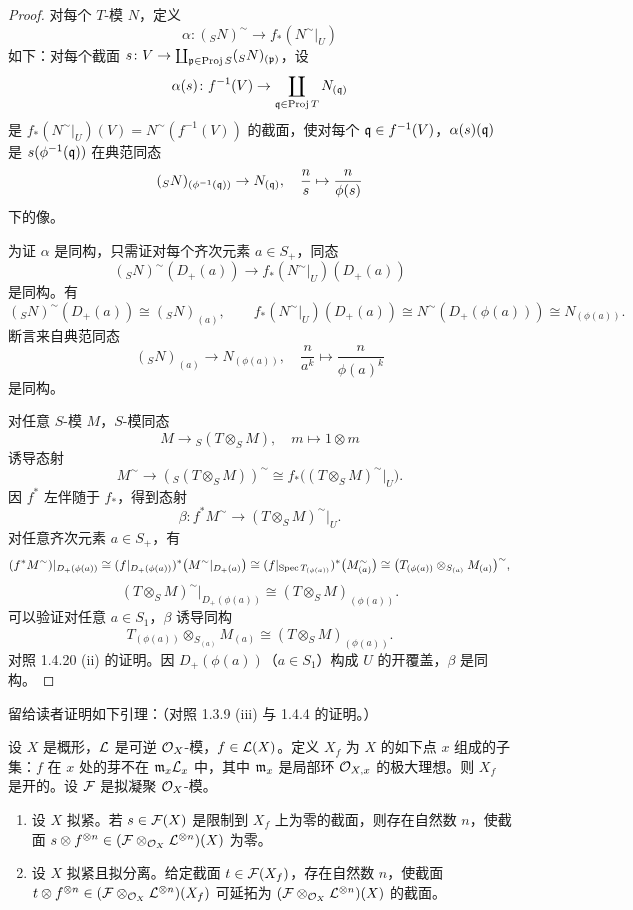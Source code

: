 \begin{proof}
对每个 $T$-模 $N$，定义
\[
\alpha\colon({}_SN)^\sim\to f_*(N^\sim|_U)
\]
如下：对每个截面 $s\colon V\to\coprod_{\mathfrak{p}\in\operatorname{Proj} S}({}_SN)_{(\mathfrak{p})}$，设
\[
\alpha(s)\colon f^{-1}(V)\to\coprod_{\mathfrak{q}\in\operatorname{Proj} T}N_{(\mathfrak{q})}
\]
是 $f_*(N^\sim|_U)(V)=N^\sim(f^{-1}(V))$ 的截面，使对每个 $\mathfrak{q}\in f^{-1}(V)$，$\alpha(s)(\mathfrak{q})$ 是 $s(\phi^{-1}(\mathfrak{q}))$ 在典范同态
\[
({}_SN)_{(\phi^{-1}(\mathfrak{q}))}\to N_{(\mathfrak{q})},\quad\frac{n}{s}\mapsto\frac{n}{\phi(s)}
\]
下的像。

为证 $\alpha$ 是同构，只需证对每个齐次元素 $a\in S_+$，同态
\[
({}_SN)^\sim(D_+(a))\to f_*(N^\sim|_U)(D_+(a))
\]
是同构。有
\[
({}_SN)^\sim(D_+(a))\cong({}_SN)_{(a)},\qquad
f_*(N^\sim|_U)(D_+(a))\cong N^\sim(D_+(\phi(a)))\cong N_{(\phi(a))}.
\]
断言来自典范同态
\[
({}_SN)_{(a)}\to N_{(\phi(a))},\quad\frac{n}{a^k}\mapsto\frac{n}{\phi(a)^k}
\]
是同构。

对任意 $S$-模 $M$，$S$-模同态
\[
M\to{}_S(T\otimes_SM),\quad m\mapsto1\otimes m
\]
诱导态射
\[
M^\sim\to({}_S(T\otimes_SM))^\sim\cong f_*\bigl((T\otimes_SM)^\sim|_U\bigr).
\]
因 $f^*$ 左伴随于 $f_*$，得到态射
\[
\beta\colon f^*M^\sim\to(T\otimes_SM)^\sim|_U.
\]
对任意齐次元素 $a\in S_+$，有
\[
(f^*M^\sim)|_{D_+(\phi(a))}\cong(f|_{D_+(\phi(a))})^*\bigl(M^\sim|_{D_+(a)}\bigr)\cong(f|_{\operatorname{Spec} T_{(\phi(a))}})^*\bigl(M^\sim_{(a)}\bigr)\cong\bigl(T_{(\phi(a))}\otimes_{S_{(a)}}M_{(a)}\bigr)^\sim,
\]
\[
(T\otimes_SM)^\sim|_{D_+(\phi(a))}\cong(T\otimes_SM)_{(\phi(a))}.
\]
可以验证对任意 $a\in S_1$，$\beta$ 诱导同构
\[
T_{(\phi(a))}\otimes_{S_{(a)}}M_{(a)}\cong(T\otimes_SM)_{(\phi(a))}.
\]
对照 1.4.20 (ii) 的证明。因 $D_+(\phi(a))$（$a\in S_1$）构成 $U$ 的开覆盖，$\beta$ 是同构。
\end{proof}

留给读者证明如下引理：（对照 1.3.9 (iii) 与 1.4.4 的证明。）

\begin{lemma}\label{it:1.4.21}
设 $X$ 是概形，$\mathcal{L}$ 是可逆 $\mathcal{O}_X$-模，$f\in\mathcal{L}(X)$。定义 $X_f$ 为 $X$ 的如下点 $x$ 组成的子集：$f$ 在 $x$ 处的芽不在 $\mathfrak{m}_x\mathcal{L}_x$ 中，其中 $\mathfrak{m}_x$ 是局部环 $\mathcal{O}_{X,x}$ 的极大理想。则 $X_f$ 是开的。设 $\mathcal{F}$ 是拟凝聚 $\mathcal{O}_X$-模。
\begin{enumerate}[label=(\roman*),leftmargin=2.8em]
  \item 设 $X$ 拟紧。若 $s\in\mathcal{F}(X)$ 是限制到 $X_f$ 上为零的截面，则存在自然数 $n$，使截面 $s\otimes f^{\otimes n}\in(\mathcal{F}\otimes_{\mathcal{O}_X}\mathcal{L}^{\otimes n})(X)$ 为零。
  \item 设 $X$ 拟紧且拟分离。给定截面 $t\in\mathcal{F}(X_f)$，存在自然数 $n$，使截面 $t\otimes f^{\otimes n}\in(\mathcal{F}\otimes_{\mathcal{O}_X}\mathcal{L}^{\otimes n})(X_f)$ 可延拓为 $(\mathcal{F}\otimes_{\mathcal{O}_X}\mathcal{L}^{\otimes n})(X)$ 的截面。
\end{enumerate}
\end{lemma}

